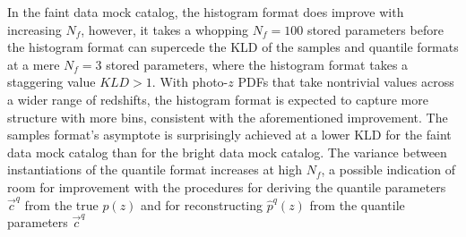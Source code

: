 \documentclass[\docopts]{\docclass}
\newcommand{\pz}{photo-$z$ PDF}
\newcommand{\mgdata}{bright\xspace}
\newcommand{\ssdata}{faint\xspace}
\begin{document}
In the \ssdata data mock catalog, the histogram format does improve with 
increasing $N_{f}$, however, it takes a whopping $N_{f}=100$ stored parameters 
before the histogram format can supercede the KLD of the samples and quantile 
formats at a mere $N_{f}=3$ stored parameters, where the histogram format takes 
a staggering value $KLD>1$.
With \pz s that take nontrivial values across a wider range of redshifts, the 
histogram format is expected to capture more structure with more bins, 
consistent with the aforementioned improvement.
The samples format's asymptote is surprisingly achieved at a lower KLD for the 
\ssdata data mock catalog than for the \mgdata data mock catalog.
The variance between instantiations of the quantile format increases at high 
$N_{f}$, a possible indication of room for improvement with the procedures for 
deriving the quantile parameters $\vec{c}^{q}$ from the true $p(z)$ and for 
reconstructing $\hat{p}^{q}(z)$ from the quantile parameters $\vec{c}^{q}$
\end{document}
